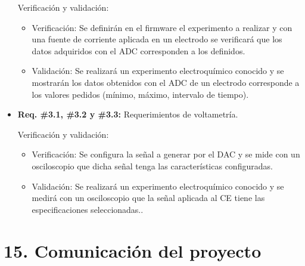 \documentclass[11pt]{charter}
\begin{document}
\begin{itemize}
Verificación y validación:
\begin{itemize}
\item Verificación: Se definirán en el firmware el experimento a realizar y con una fuente de corriente aplicada en un electrodo se verificará que los datos adquiridos con el ADC corresponden a los definidos.
\item Validación: Se realizará un experimento electroquímico conocido y se mostrarán los datos obtenidos con el ADC de un electrodo corresponde a los valores pedidos (mínimo, máximo, intervalo de tiempo).
\end{itemize}

\item \textbf{Req. \#3.1, \#3.2 y \#3.3:} Requerimientos de voltametría.

Verificación y validación:
\begin{itemize}
\item Verificación: Se configura la señal a generar por el DAC y se mide con un osciloscopio que dicha señal tenga las características configuradas.
\item Validación: Se realizará un experimento electroquímico conocido y se medirá con un osciloscopio que la señal aplicada al CE tiene las especificaciones seleccionadas..
\end{itemize}

\end{itemize}


\section{15. Comunicación del proyecto}
\label{sec:comunicaciones}
\end{document}
